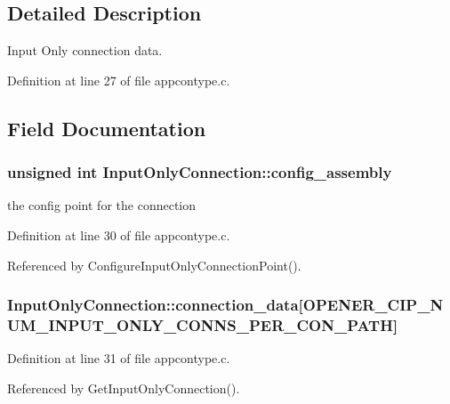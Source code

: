 \subsection{\-Detailed \-Description}
\-Input \-Only connection data. 

\-Definition at line 27 of file appcontype.\-c.



\subsection{\-Field \-Documentation}
\hypertarget{structInputOnlyConnection_af1b6da3ad66d0252f1a10ce60e33677c}{
\subsubsection[{config\-\_\-assembly}]{\setlength{\rightskip}{0pt plus 5cm}unsigned int {\bf \-Input\-Only\-Connection\-::config\-\_\-assembly}}}\label{d7/dd8/structInputOnlyConnection_af1b6da3ad66d0252f1a10ce60e33677c}
the config point for the connection 

\-Definition at line 30 of file appcontype.\-c.



\-Referenced by \-Configure\-Input\-Only\-Connection\-Point().

\hypertarget{structInputOnlyConnection_a5aa38639477c644ea7260b429e1c2510}{
\subsubsection[{connection\-\_\-data}]{ {\bf \-Input\-Only\-Connection\-::connection\-\_\-data}\mbox{[}{\bf \-O\-P\-E\-N\-E\-R\-\_\-\-C\-I\-P\-\_\-\-N\-U\-M\-\_\-\-I\-N\-P\-U\-T\-\_\-\-O\-N\-L\-Y\-\_\-\-C\-O\-N\-N\-S\-\_\-\-P\-E\-R\-\_\-\-C\-O\-N\-\_\-\-P\-A\-T\-H}\mbox{]}}}\label{d7/dd8/structInputOnlyConnection_a5aa38639477c644ea7260b429e1c2510}


\-Definition at line 31 of file appcontype.\-c.



\-Referenced by \-Get\-Input\-Only\-Connection().


